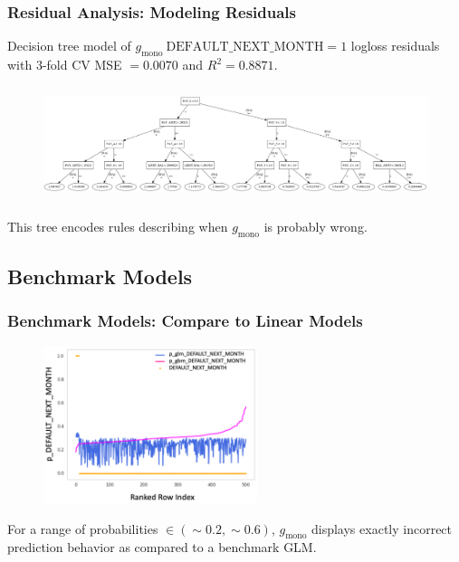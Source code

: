 \documentclass[11pt,
               aspectratio=169,
               hyperref={colorlinks}
               ]{beamer}
\begin{document}
			\begin{frame}[t]
		
				\frametitle{\textbf{Residual Analysis}: Modeling Residuals}
				Decision tree model of $g_{\text{mono}} ~\text{DEFAULT\_NEXT\_MONTH} =1$ logloss residuals with 3-fold CV MSE $=0.0070$ and $R^2=0.8871$.
				\begin{figure}
					\begin{center}
						\includegraphics[height=95pt, width=330pt]{../img/surrogate_dt_1.png}
					\end{center}
				\end{figure}	
				This tree encodes rules describing when $g_{\text{mono}}$ is probably wrong.
			\end{frame}
			
		\subsection{Benchmark Models}

			\begin{frame}
		
				\frametitle{\textbf{Benchmark Models}: Compare to Linear Models}
				\begin{figure}
					\begin{center}
						\includegraphics[height=130pt]{../img/benchmark.png}
					\end{center}
				\end{figure}	
				\vspace{-10pt}
				For a range of probabilities $\in  (\sim0.2, \sim0.6)$, $g_{\text{mono}}$ displays exactly incorrect prediction behavior as compared to a benchmark GLM.
			\end{frame}
\end{document}
